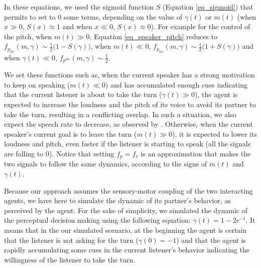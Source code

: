 
In these equations, we used the sigmoid function $S$ (Equation \ref{eq_sigmoid}) that permits to set to $0$ some terms, depending on the value of $\gamma(t)$ or $m(t)$ (when $x \gg 0$, $S(x)\approx 1$ and when $x \ll 0$, $S(x)\approx 0$). 
For example for the control of the pitch, 
when $m(t) \gg 0$, Equation \ref{eq_speaker_pitch} reduces to $f_{p_{loc}}(m,\gamma) \sim \frac{1}{2}\big( 1-S(\gamma) \big)$, 
when $m(t) \ll 0$, $f_{p_{loc}}(m,\gamma) \sim \frac{1}{2}\big( 1 + S(\gamma)\big)$ 
and when $\gamma(t) \ll 0$, $f_{p^{loc}}(m,\gamma) \sim \frac{1}{2}$. 

We set these functions such as, when the current speaker has a strong motivation to keep on speaking ($m(t) \ll 0$) and has accumulated enough cues indicating that the current listener is about to take the turn  ($\gamma(t) \gg 0$), the agent is expected to increase the loudness and the pitch of its voice to avoid its partner to take the turn, resulting in a conflicting overlap. In such a situation, we also expect the speech rate to decrease, as observed by \citep{schegloff_overlapping_2000}.
Otherwise, when the current speaker's current goal is to leave the turn ($m(t) \gg 0$), it is expected to lower its loudness and pitch, even faster if the listener is starting to speak (all the signals are falling to 0).
Notice that setting $f_p = f_v$ is an approximation that makes the two signals to follow the same dynamics, according to the signs of $m(t)$ and $\gamma(t)$. 

Because our approach assumes the sensory-motor coupling of the two interacting agents, we have here to simulate the dynamic of its partner's behavior, as perceived by the agent.
For the sake of simplicity, we simulated the dynamic of the perceptual decision making using the following equation: $\gamma(t)=1-2e^{-t}$. 
It means that in the our simulated scenario, at the beginning the agent is certain that the listener is not asking for the turn ($\gamma(0) = -1$) and that the agent is rapidly accumulating some cues in the current listener's behavior indicating the willingness of the listener to take the turn. 

